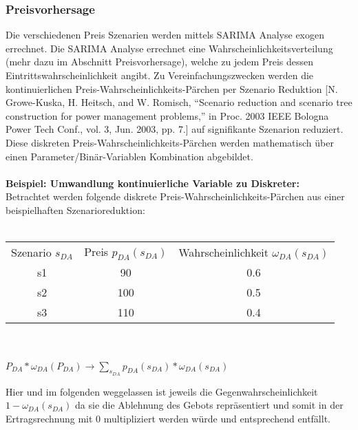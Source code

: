 \subsubsection{Preisvorhersage}
Die verschiedenen Preis Szenarien werden mittels SARIMA Analyse exogen errechnet. Die SARIMA Analyse errechnet eine Wahrscheinlichkeitsverteilung (mehr dazu im Abschnitt Preisvorhersage), welche zu jedem Preis dessen Eintrittswahrscheinlichkeit angibt. Zu Vereinfachungszwecken werden die kontinuierlichen Preis-Wahrscheinlichkeits-Pärchen per Szenario Reduktion [N. Growe-Kuska, H. Heitsch, and W. Romisch, “Scenario reduction and scenario tree construction for power management problems,” in Proc.
		2003 IEEE Bologna Power Tech Conf., vol. 3, Jun. 2003, pp. 7.] auf signifikante Szenarion reduziert.
Diese diskreten Preis-Wahrscheinlichkeits-Pärchen werden mathematisch über einen Parameter/Binär-Variablen Kombination abgebildet.\\
\\
\textbf{Beispiel: Umwandlung kontinuierliche Variable zu Diskreter:}
\\
Betrachtet werden folgende diskrete Preis-Wahrscheinlichkeits-Pärchen aus einer beispielhaften Szenarioreduktion:\\
\\
\begin{tabular}{c|c|c}
	Szenario $s_{DA}$ & Preis $p_{DA}(s_{DA})$ & Wahrscheinlichkeit $\omega_{DA}(s_{DA})$ \\
	s1                & 90                     & 0.6                                      \\
	s2                & 100                    & 0.5                                      \\
	s3                & 110                    & 0.4                                      \\
\end{tabular}\\
\\

$P_{DA} * \omega_{DA}(P_{DA}) \rightarrow \sum_{s_{DA}} p_{DA}(s_{DA}) * \omega_{DA}(s_{DA})$\\


Hier und im folgenden weggelassen ist jeweils die Gegenwahrscheinlichkeit $1-\omega_{DA}(s_{DA})$ da sie die Ablehnung des Gebots repräsentiert und somit in der Ertragsrechnung mit 0 multipliziert werden würde und entsprechend entfällt.\\
\\

